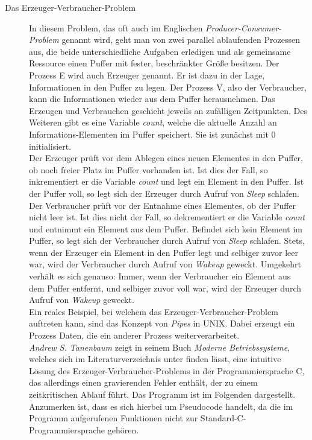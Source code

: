 \begin{description}
						\begin{description}
							\item[Das Erzeuger-Verbraucher-Problem]
							
								In diesem Problem, das oft auch im Englischen \textit{Producer-Consumer-Problem} genannt wird, geht man von zwei parallel ablaufenden Prozessen aus, die beide unterschiedliche Aufgaben erledigen und als gemeinsame Ressource einen Puffer mit fester, beschränkter Größe besitzen. Der Prozess E wird auch Erzeuger genannt. Er ist dazu in der Lage, Informationen in den Puffer zu legen. Der Prozess V, also der Verbraucher, kann die Informationen wieder aus dem Puffer herausnehmen. Das Erzeugen und Verbrauchen geschieht jeweils an zufälligen Zeitpunkten. Des Weiteren gibt es eine Variable \textit{count}, welche die aktuelle Anzahl an Informations-Elementen im Puffer speichert. Sie ist zunächst mit 0 initialisiert.\\
								Der Erzeuger prüft vor dem Ablegen eines neuen Elementes in den Puffer, ob noch freier Platz im Puffer vorhanden ist. Ist dies der Fall, so inkrementiert er die Variable \textit{count} und legt ein Element in den Puffer. Ist der Puffer voll, so legt sich der Erzeuger durch Aufruf von \textit{Sleep} schlafen. Der Verbraucher prüft vor der Entnahme eines Elementes, ob der Puffer nicht leer ist. Ist dies nicht der Fall, so dekrementiert er die Variable \textit{count} und entnimmt ein Element aus dem Puffer. Befindet sich kein Element im Puffer, so legt sich der Verbraucher durch Aufruf von \textit{Sleep} schlafen. Stets, wenn der Erzeuger ein Element in den Puffer legt und selbiger zuvor leer war, wird der Verbraucher durch Aufruf von \textit{Wakeup} geweckt. Umgekehrt verhält es sich genauso: Immer, wenn der Verbraucher ein Element aus dem Puffer entfernt, und selbiger zuvor voll war, wird der Erzeuger durch Aufruf von \textit{Wakeup} geweckt.\\
								Ein reales Beispiel, bei welchem das Erzeuger-Verbraucher-Problem auftreten kann, sind das Konzept von \textit{Pipes} in UNIX. Dabei erzeugt ein Prozess Daten, die ein anderer Prozess weiterverarbeitet. \cite{ModerneBetriebssysteme}\\
								\textit{Andrew S. Tanenbaum} zeigt in seinem Buch \textit{Moderne Betriebssysteme}, welches sich im Literaturverzeichnis unter \cite{ModerneBetriebssysteme} finden lässt, eine intuitive Lösung des Erzeuger-Verbraucher-Problems in der Programmiersprache C, das allerdings einen gravierenden Fehler enthält, der zu einem zeitkritischen Ablauf führt. Das Programm ist im Folgenden dargestellt. Anzumerken ist, dass es sich hierbei um Pseudocode handelt, da die im Programm aufgerufenen Funktionen nicht zur Standard-C-Programmiersprache gehören. \cite{ModerneBetriebssysteme}
								

\end{description}
\end{description}
